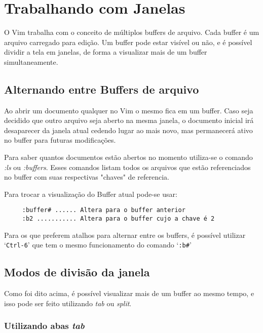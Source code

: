 
\chapter{Trabalhando com Janelas}\label{cha:Trabalhando com janelas}

O Vim trabalha com o conceito de múltiplos buffers de arquivo. Cada
buffer é um arquivo carregado para edição. Um buffer pode
estar visível ou não, e é possível dividir a tela em janelas, de forma
a visualizar mais de um buffer simultaneamente. 


\section{Alternando entre Buffers de arquivo}

Ao abrir um documento qualquer no Vim o mesmo fica em um buffer. Caso 
seja decidido que outro arquivo seja aberto na mesma janela, o documento
inicial irá desaparecer da janela atual cedendo lugar ao mais novo, mas 
permanecerá ativo no buffer para futuras modificações.

Para saber quantos documentos estão abertos no momento utiliza-se o comando
{\em :ls} ou {\em :buffers}. Esses comandos listam todos os arquivos que 
estão referenciados no buffer com suas respectivas "chaves" de referencia.

Para trocar a visualização do Buffer atual pode-se usar:

\begin{verbatim}
     :buffer# ...... Altera para o buffer anterior
     :b2 ........... Altera para o buffer cujo a chave é 2
\end{verbatim}

{\Large {}} Para os que preferem atalhos para alternar entre
os buffers, é possível utilizar `{\tt Ctrl-6}' que tem o mesmo funcionamento do
comando `\verb+:b#+'


\section{Modos de divisão da janela}

Como foi dito acima, é possível visualizar mais de um buffer ao mesmo 
tempo, e isso pode ser feito utilizando {\em tab} ou {\em split}.


\subsection{Utilizando abas {\em tab}}


